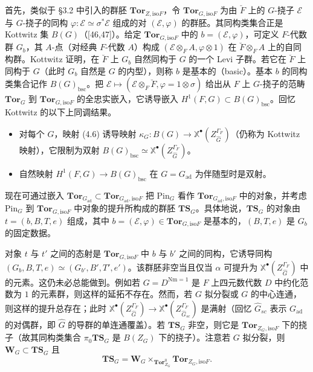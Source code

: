 首先，类似于 §3.2 中引入的群胚 $\mathbf{Tor}_{Z,\mathrm{iso}F}$，令 $\mathbf{Tor}_{G,\mathrm{iso}F}$ 为由 $\breve F$ 上的 $G$-挠子 $\mathcal{E}$ 与 $G$-挠子的同构 $\varphi:\mathcal{E}\simeq\sigma^*\mathcal{E}$ 组成的对 $(\mathcal{E},\varphi)$ 的群胚。其同构类集合正是 Kottwitz 集 $B(G)$（[46,47]）。给定 $\mathbf{Tor}_{G,\mathrm{iso}F}$ 中的 $b=(\mathcal{E},\varphi)$，可定义 $F$-代数群 $G_b$，其 $A$-点（对经典 $F$-代数 $A$）构成 $(\mathcal{E}\otimes_FA,\varphi\otimes1)$ 在 $\breve F\otimes_FA$ 上的自同构群。Kottwitz 证明，在 $\breve F$ 上 $G_b$ 自然同构于 $G$ 的一个 Levi 子群。若它在 $\breve F$ 上同构于 $G$（此时 $G_b$ 自然是 $G$ 的内型），则称 $b$ 是基本的（basic）。基本 $b$ 的同构类集合记作 $B(G)_{\mathrm{bsc}}$。把 $\mathcal{E}\mapsto(\mathcal{E}\otimes_F\breve F,\varphi=1\otimes\sigma)$ 给出从 $F$ 上 $G$-挠子的范畴 $\mathbf{Tor}_G$ 到 $\mathbf{Tor}_{G,\mathrm{iso}F}$ 的全忠实嵌入，它诱导嵌入 $H^1(F,G)\subset B(G)_{\mathrm{bsc}}$。回忆 Kottwitz 的以下上同调结果。
\begin{itemize}[leftmargin=1.6em,itemsep=0.2em]
\item 对每个 $G$，映射 (4.6) 诱导映射 $\kappa_G:B(G)\to\mathbb{X}^\bullet(Z_{\hat G}^{\Gamma_F})$（仍称为 Kottwitz 映射），它限制为双射 $B(G)_{\mathrm{bsc}}\simeq\mathbb{X}^\bullet(Z_{\hat G}^{\Gamma_F})$。
\item 自然映射 $H^1(F,G)\to B(G)_{\mathrm{bsc}}$ 在 $G=G_{\mathrm{ad}}$ 为伴随型时是双射。
\end{itemize}

现在可通过嵌入 $\mathbf{Tor}_{G_{\mathrm{ad}}}\subset\mathbf{Tor}_{G_{\mathrm{ad}},\mathrm{iso}F}$ 把 $\mathrm{Pin}_G$ 看作 $\mathbf{Tor}_{G_{\mathrm{ad}},\mathrm{iso}F}$ 中的对象，并考虑 $\mathrm{Pin}_G$ 到 $\mathbf{Tor}_{G,\mathrm{iso}F}$ 中对象的提升所构成的群胚 $\mathbf{TS}_G$。具体地说，$\mathbf{TS}_G$ 的对象由 $t=(b,B,T,e)$ 组成，其中 $b=(\mathcal{E},\varphi)\in\mathbf{Tor}_{G,\mathrm{iso}F}$ 是基本的，$(B,T,e)$ 是 $G_b$ 的固定数据。

对象 $t$ 与 $t'$ 之间的态射是 $\mathbf{Tor}_{G,\mathrm{iso}F}$ 中 $b$ 与 $b'$ 之间的同构，它诱导同构 $(G_b,B,T,e)\simeq(G_{b'},B',T',e')$。该群胚非空当且仅当 $\alpha$ 可提升为 $\mathbb{X}^\bullet(Z_{\hat G}^{\Gamma_F})$ 中的元素。这仍未必总能做到。例如若 $G=D^{\mathrm{Nm}=1}$ 是 $F$ 上四元数代数 $D$ 中约化范数为 $1$ 的元素群，则这样的延拓不存在。然而，若 $G$ 拟分裂或 $G$ 的中心连通，则这样的提升总存在；此时 $\mathbb{X}^\bullet(Z_{\hat G}^{\Gamma_F})\to\mathbb{X}^\bullet(Z_{\hat G_{sc}}^{\Gamma_F})$ 是满射（回忆 $\hat G_{sc}$ 表示 $G_{\mathrm{ad}}$ 的对偶群，即 $\hat G$ 的导群的单连通覆盖）。若 $\mathbf{TS}_G$ 非空，则它是 $\mathbf{Tor}_{Z_G,\mathrm{iso}F}$ 下的挠子（故其同构类集合 $\pi_0\mathbf{TS}_G$ 是 $B(Z_G)$ 下的挠子）。注意若 $G$ 拟分裂，则 $\mathbf{W}_G\subset\mathbf{TS}_G$ 且
\[
\mathbf{TS}_G=\mathbf{W}_G\times_{\mathbf{Tor}^0_{Z_G}}\mathbf{Tor}_{Z_G,\mathrm{iso}F}.
\]

